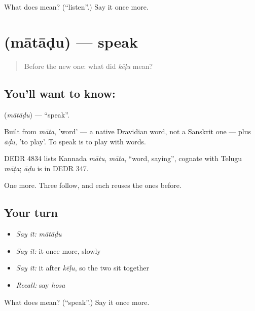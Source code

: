 \begin{tcolorbox}[breakable,colback=teal!4,colframe=teal!35!black,title={Before you move on}]
What does  mean? (\textquotedblleft{}listen\textquotedblright{}.) Say it once more.
\end{tcolorbox}
\section[\texorpdfstring{\kn{ಮಾತಾಡು} (mātāḍu)}{ಮಾತಾಡು (mātāḍu)}]{ (mātāḍu) — speak}

\label{lesson:KA-C44-speak}



\begin{quote}
Before the new one: what did \emph{kēḷu} mean?
\end{quote}

\subsection*{You'll want to know: }
\textbf{} (\emph{mātāḍu}) — \textquotedblleft{}speak\textquotedblright{}.

Built from \emph{māta}, 'word' — a native Dravidian word, not a Sanskrit one — plus \emph{āḍu}, 'to play'. To speak is to play with words.

DEDR 4834 lists Kannada \emph{mātu}, \emph{māta}, \textquotedblleft{}word, saying\textquotedblright{}, cognate with Telugu \emph{māṭa}; \emph{āḍu} is in DEDR 347.

\begin{grammarlens}[title={What you've built}]
One more. Three follow, and each reuses the ones before.
\end{grammarlens}

\subsection*{Your turn}
\begin{itemize}
\raggedright
  \item \emph{Say it:} \emph{mātāḍu}
  \item \emph{Say it:} it once more, slowly
  \item \emph{Say it:} it after \emph{kēḷu}, so the two sit together
  \item \emph{Recall:} say \emph{hosa}
\end{itemize}

\begin{tcolorbox}[breakable,colback=teal!4,colframe=teal!35!black,title={Before you move on}]
What does  mean? (\textquotedblleft{}speak\textquotedblright{}.) Say it once more.
\end{tcolorbox}
